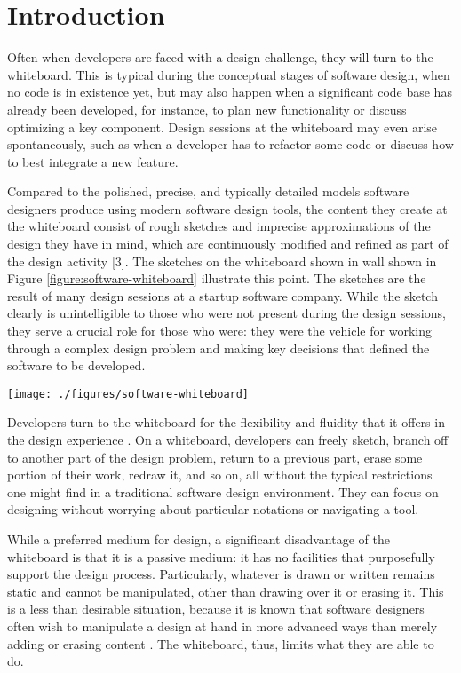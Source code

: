 \chapter{Introduction}
\label{chapter:introduction}

Often when developers are faced with a design challenge, they will turn to the whiteboard.  This is typical during the conceptual stages of software design, when no code is in existence yet, but may also happen when a significant code base has already been developed, for instance, to plan new functionality or discuss optimizing a key component. Design sessions at the whiteboard may even arise spontaneously, such as when a developer has to refactor some code or discuss how to best integrate a new feature.

Compared to the polished, precise, and typically detailed models software designers produce using modern software design tools, the content they create at the whiteboard consist of rough sketches and imprecise approximations of the design they have in mind, which are continuously modified and refined as part of the design activity [3]. The sketches on the whiteboard shown in wall shown in Figure \ref{figure:software-whiteboard} illustrate this point. The sketches are the result of many design sessions at a startup software company. While the sketch clearly is unintelligible to those who were not present during the design sessions, they serve a crucial role for those who were: they were the vehicle for working through a complex design problem and making key decisions that defined the software to be developed.

\begin{figure*}[tbh]
  \centering
  \texttt{[image: ./figures/software-whiteboard]}
  \caption{Whiteboard wall at a startup company.}
  \label{figure:software-whiteboard}
\end{figure*}

Developers turn to the whiteboard for the flexibility and fluidity that it offers in the design experience \cite{cherubini2007let}. On a whiteboard, developers can freely sketch, branch off to another part of the design problem, return to a previous part, erase some portion of their work, redraw it, and so on, all without the typical restrictions one might find in a traditional software design environment. They can focus on designing without worrying about particular notations or navigating a tool.

While a preferred medium for design, a significant disadvantage of the whiteboard is that it is a passive medium: it has no facilities that purposefully support the design process. Particularly, whatever is drawn or written remains static and cannot be manipulated, other than drawing over it or erasing it. This is a less than desirable situation, because it is known that software designers often wish to manipulate a design at hand in more advanced ways than merely adding or erasing content \cite{dekel2007notation}. The whiteboard, thus, limits what they are able to do.

